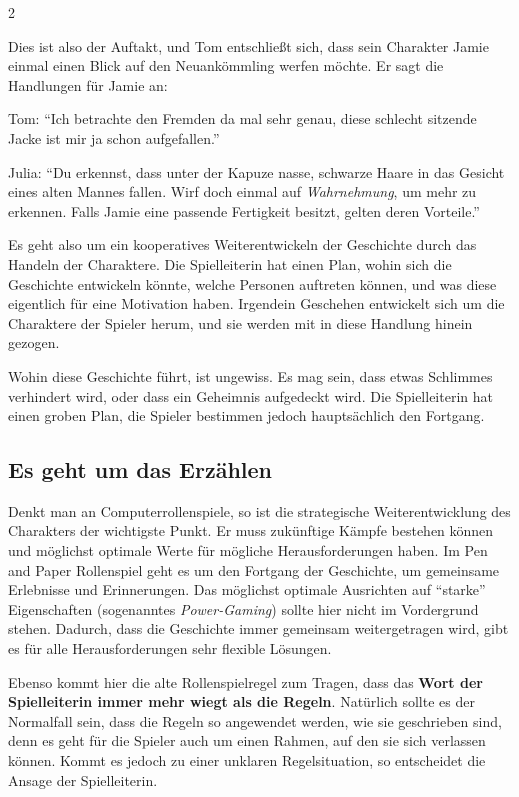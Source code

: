 \begin{multicols*}{2}
\begin{pexample}
Dies ist also der Auftakt, und Tom entschließt sich, dass sein Charakter Jamie einmal einen Blick auf den Neuankömmling werfen möchte. Er sagt die Handlungen für Jamie an:

Tom: ``Ich betrachte den Fremden da mal sehr genau, diese schlecht sitzende Jacke ist mir ja schon aufgefallen.''

Julia: ``Du erkennst, dass unter der Kapuze nasse, schwarze Haare in das Gesicht eines alten Mannes fallen. Wirf doch einmal auf \textit{Wahrnehmung}, um mehr zu erkennen. Falls Jamie eine passende Fertigkeit besitzt, gelten deren Vorteile.''
\end{pexample}

Es geht also um ein kooperatives Weiterentwickeln der Geschichte durch das Handeln der Charaktere. Die Spielleiterin hat einen Plan, wohin sich die Geschichte entwickeln könnte, welche Personen auftreten können, und was diese eigentlich für eine Motivation haben. Irgendein Geschehen entwickelt sich um die Charaktere der Spieler herum, und sie werden mit in diese Handlung hinein gezogen.

Wohin diese Geschichte führt, ist ungewiss. Es mag sein, dass etwas Schlimmes verhindert wird, oder dass ein Geheimnis aufgedeckt wird. Die Spielleiterin hat einen groben Plan, die Spieler bestimmen jedoch hauptsächlich den Fortgang.

\subsection{Es geht um das Erzählen}

Denkt man an Computerrollenspiele, so ist die strategische Weiterentwicklung des Charakters der wichtigste Punkt. Er muss zukünftige Kämpfe bestehen können und möglichst optimale Werte für mögliche Herausforderungen haben. Im Pen and Paper Rollenspiel geht es um den Fortgang der Geschichte, um gemeinsame Erlebnisse und Erinnerungen. Das möglichst optimale Ausrichten auf ``starke'' Eigenschaften (sogenanntes \textit{Power-Gaming}) sollte hier nicht im Vordergrund stehen. Dadurch, dass die Geschichte immer gemeinsam weitergetragen wird, gibt es für alle Herausforderungen sehr flexible Lösungen.

Ebenso kommt hier die alte Rollenspielregel zum Tragen, dass das \textbf{Wort der Spielleiterin immer mehr wiegt als die Regeln}. Natürlich sollte es der Normalfall sein, dass die Regeln so angewendet werden, wie sie geschrieben sind, denn es geht für die Spieler auch um einen Rahmen, auf den sie sich verlassen können. Kommt es jedoch zu einer unklaren Regelsituation, so entscheidet die Ansage der Spielleiterin.


\end{multicols*}
